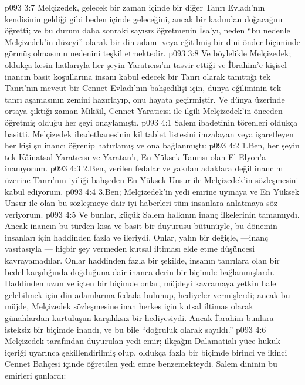 \vs p093 3:7 Melçizedek, gelecek bir zaman içinde bir diğer Tanrı Evladı’nın kendisinin geldiği gibi beden içinde geleceğini, ancak bir kadından doğacağını öğretti; ve bu durum daha sonraki sayısız öğretmenin İsa’yı, neden “bu nedenle Melçizedek’in düzeyi” olarak bir din adamı veya eğitilmiş bir dini önder biçiminde görmüş olmasının nedenini teşkil etmektedir.
\vs p093 3:8 Ve böylelikle Melçizedek; oldukça kesin hatlarıyla her şeyin Yaratıcısı’nı tasvir ettiği ve İbrahim’e kişisel inancın basit koşullarına insanı kabul edecek bir Tanrı olarak tanıttığı tek Tanrı’nın mevcut bir Cennet Evladı’nın bahşedilişi için, dünya eğiliminin tek tanrı aşamasının zemini hazırlayıp, onu hayata geçirmiştir. Ve dünya üzerinde ortaya çıktığı zaman Mikâil, Cennet Yaratıcısı ile ilgili Melçizedek’in önceden öğretmiş olduğu her şeyi onaylamıştı.
\vs p093 4:1 Salem ibadetinin törenleri oldukça basitti. Melçizedek ibadethanesinin kil tablet listesini imzalayan veya işaretleyen her kişi şu inancı öğrenip hatırlamış ve ona bağlanmıştı:
\vs p093 4:2 1.\bibnobreakspace Ben, her şeyin tek Kâinatsal Yaratıcısı ve Yaratan’ı, En Yüksek Tanrısı olan El Elyon’a inanıyorum.
\vs p093 4:3 2.\bibnobreakspace Ben, verilen fedalar ve yakılan adaklara değil inancım üzerine Tanrı’nın iyiliği bahşeden En Yüksek Unsur ile Melçizedek’in sözleşmesini kabul ediyorum.
\vs p093 4:4 3.\bibnobreakspace Ben; Melçizedek’in yedi emrine uymaya ve En Yüksek Unsur ile olan bu sözleşmeye dair iyi haberleri tüm insanlara anlatmaya söz veriyorum.
\vs p093 4:5 Ve bunlar, küçük Salem halkının inanç ilkelerinin tamamıydı. Ancak inancın bu türden kısa ve basit bir duyurusu bütünüyle, bu dönemin insanları için haddinden fazla ve ileriydi. Onlar, yalın bir değişle, ---inanç vasıtasıyla --- hiçbir şey vermeden kutsal iltiması elde etme düşüncesi kavrayamadılar. Onlar haddinden fazla bir şekilde, insanın tanrılara olan bir bedel karşılığında doğduğuna dair inanca derin bir biçimde bağlanmışlardı. Haddinden uzun ve içten bir biçimde onlar, müjdeyi kavramaya yetkin hale gelebilmek için din adamlarına fedada bulunup, hediyeler vermişlerdi; ancak bu müjde, Melçizedek sözleşmesine inan herkes için kutsal iltimas olarak günahlardan kurtuluşun karşılıksız bir hediyesiydi. Ancak İbrahim bunlara isteksiz bir biçimde inandı, ve bu bile “doğruluk olarak sayıldı.”
\vs p093 4:6 Melçizedek tarafından duyurulan yedi emir; ilkçağın Dalamatialı yüce hukuk içeriği uyarınca şekillendirilmiş olup, oldukça fazla bir biçimde birinci ve ikinci Cennet Bahçesi içinde öğretilen yedi emre benzemekteydi. Salem dininin bu emirleri şunlardı:

